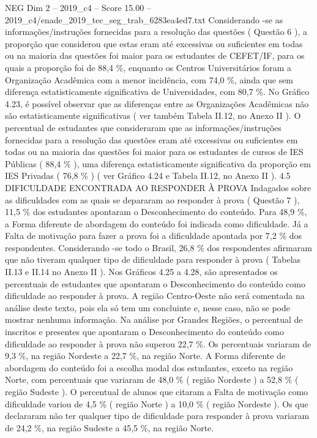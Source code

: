 \begin{textsample}{NEG Dim 2 – 2019\_c4 – Score 15.00 – 2019\_c4/enade\_2019\_tec\_seg\_trab\_6283ea4ed7.txt}
Considerando -se as informações/instruções fornecidas para a resolução das questões ( Questão 6 ), a proporção que considerou que estas eram até excessivas ou suficientes em todas ou na maioria das questões foi maior para os estudantes de CEFET/IF, para os quais a proporção foi de 88,4 \%, enquanto os Centros Universitários foram a Organização Acadêmica com a menor incidência, com 74,0 \%, ainda que sem diferença estatisticamente significativa de Universidades, com 80,7 \%.
No Gráfico 4.23, é possível observar que as diferenças entre as Organizações Acadêmicas não são estatisticamente significativas ( ver também Tabela II.12, no Anexo II ).
O percentual de estudantes que consideraram que as informações/instruções fornecidas para a resolução das questões eram até excessivas ou suficientes em todas ou na maioria das questões foi maior para os estudantes de cursos de IES Públicas ( 88,4 \% ), uma diferença estatisticamente significativa da proporção em IES Privadas ( 76,8 \% ) ( ver Gráfico 4.24 e Tabela II.12, no Anexo II ). 4.5 DIFICULDADE ENCONTRADA AO RESPONDER À PROVA Indagados sobre as dificuldades com as quais se depararam ao responder à prova ( Questão 7 ), 11,5 \% dos estudantes apontaram o Desconhecimento do conteúdo.
Para 48,9 \%, a Forma diferente de abordagem do conteúdo foi indicada como dificuldade.
Já a Falta de motivação para fazer a prova foi a dificuldade apontada por 7,2 \% dos respondentes.
Considerando -se todo o Brasil, 26,8 \% dos respondentes afirmaram que não tiveram qualquer tipo de dificuldade para responder à prova ( Tabelas II.13 e II.14 no Anexo II ).
Nos Gráficos 4.25 a 4.28, são apresentados os percentuais de estudantes que apontaram o Desconhecimento do conteúdo como dificuldade ao responder à prova.
A região Centro-Oeste não será comentada na análise deste texto, pois ela só tem um concluinte e, nesse caso, não se pode mostrar nenhuma informação.
Na análise por Grandes Regiões, o percentual de inscritos e presentes que apontaram o Desconhecimento do conteúdo como dificuldade ao responder à prova não superou 22,7 \%.
Os percentuais variaram de 9,3 \%, na região Nordeste a 22,7 \%, na região Norte.
A Forma diferente de abordagem do conteúdo foi a escolha modal dos estudantes, exceto na região Norte, com percentuais que variaram de 48,0 \% ( região Nordeste ) a 52,8 \% ( região Sudeste ).
O percentual de alunos que citaram a Falta de motivação como dificuldade variou de 4,5 \% ( região Norte ) a 10,0 \% ( região Nordeste ).
Os que declararam não ter qualquer tipo de dificuldade para responder à prova variaram de 24,2 \%, na região Sudeste a 45,5 \%, na região Norte.

\end{textsample}
